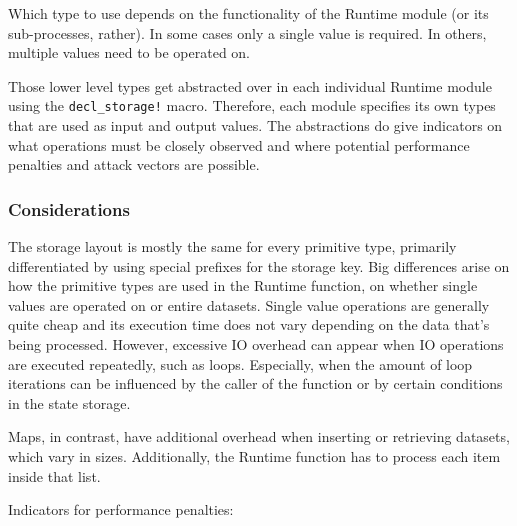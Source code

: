 \documentclass[11pt,a4paper]{article}
\begin{document}
Which type to use depends on the functionality of the Runtime module (or its sub-processes, rather).
In some cases only a single value is required. In others, multiple values need to be operated on.
\newline

Those lower level types get abstracted over in each individual Runtime module using the \verb|decl_storage!|
macro. Therefore, each module specifies its own types that are used as input and output values.
The abstractions do give indicators on what operations must be closely observed and where potential
performance penalties and attack vectors are possible.

\subsubsection{Considerations}\label{sect:primitive-types-considerations}

The storage layout is mostly the same for every primitive type, primarily differentiated
by using special prefixes for the storage key. Big differences arise on how the primitive
types are used in the Runtime function, on whether single values are operated on or entire
datasets. Single value operations are generally quite cheap and its execution time does
not vary depending on the data that's being processed. However, excessive IO overhead can appear
when IO operations are executed repeatedly, such as loops. Especially, when the amount of loop
iterations can be influenced by the caller of the function or by certain conditions in the
state storage.
\newline

Maps, in contrast, have additional overhead when inserting or retrieving
datasets, which vary in sizes. Additionally, the Runtime function has to process each item inside
that list.
\newline

Indicators for performance penalties:
\end{document}
